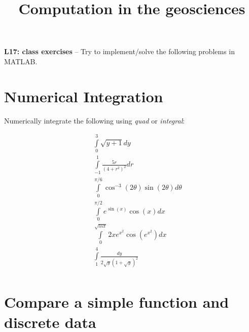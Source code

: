 \documentclass[10pt,fleqn]{article}
\title{Computation in the geosciences}
\date{\empty}
\begin{document}
\textbf{L17: class exercises} -- Try to implement/solve the following problems in MATLAB.


\section*{Numerical Integration}

Numerically integrate the following using \textit{quad} or \textit{integral}:

\begin{eqnarray} \nonumber
&& \int\limits_0^{3} \sqrt{y+1} dy \\ \nonumber
&& \int\limits_{-1}^{1} \frac{5r}{(4+r^2)^2} dr  \\ \nonumber
&& \int\limits_0^{\pi/6} \cos^{-3}(2\theta) \sin(2\theta) d\theta \\ \nonumber
&& \int\limits_0^{\pi/2} e^{\sin(x)}\cos(x) dx \\ \nonumber
&& \int\limits_0^{\sqrt{ln\pi}} 2xe^{x^2}\cos(e^{x^2}) dx  \\ \nonumber
&& \int\limits_1^{4} \frac{dy}{2\sqrt{y}(1+\sqrt{y})^2}  \\ \nonumber
\end{eqnarray}

\section*{Compare a simple function and discrete data}
\end{document}
